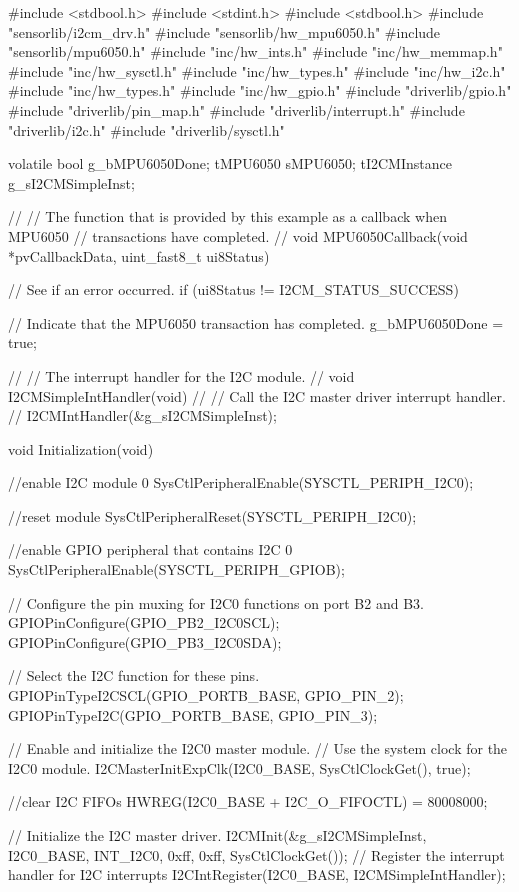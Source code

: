 \documentclass[12pt, a4paper]{article}
\begin{document}
\begin{code}
#include <stdbool.h>
#include <stdint.h>
#include <stdbool.h>
#include "sensorlib/i2cm_drv.h"
#include "sensorlib/hw_mpu6050.h"
#include "sensorlib/mpu6050.h"
#include "inc/hw_ints.h"
#include "inc/hw_memmap.h"
#include "inc/hw_sysctl.h"
#include "inc/hw_types.h"
#include "inc/hw_i2c.h"
#include "inc/hw_types.h"
#include "inc/hw_gpio.h"
#include "driverlib/gpio.h"
#include "driverlib/pin_map.h"
#include "driverlib/interrupt.h"
#include "driverlib/i2c.h"
#include "driverlib/sysctl.h"

volatile bool g_bMPU6050Done;
tMPU6050 sMPU6050;
tI2CMInstance g_sI2CMSimpleInst;

//
// The function that is provided by this example as a callback when MPU6050
// transactions have completed.
//
void MPU6050Callback(void *pvCallbackData, uint_fast8_t ui8Status)
{
    // See if an error occurred.
    if (ui8Status != I2CM_STATUS_SUCCESS)
    {
    }

    // Indicate that the MPU6050 transaction has completed.
    g_bMPU6050Done = true;
}

//
// The interrupt handler for the I2C module.
//
void I2CMSimpleIntHandler(void)
{
    //
    // Call the I2C master driver interrupt handler.
    //
    I2CMIntHandler(&g_sI2CMSimpleInst);
}

void Initialization(void)
{
    //enable I2C module 0
    SysCtlPeripheralEnable(SYSCTL_PERIPH_I2C0);

    //reset module
    SysCtlPeripheralReset(SYSCTL_PERIPH_I2C0);

    //enable GPIO peripheral that contains I2C 0
    SysCtlPeripheralEnable(SYSCTL_PERIPH_GPIOB);

    // Configure the pin muxing for I2C0 functions on port B2 and B3.
    GPIOPinConfigure(GPIO_PB2_I2C0SCL);
    GPIOPinConfigure(GPIO_PB3_I2C0SDA);

    // Select the I2C function for these pins.
    GPIOPinTypeI2CSCL(GPIO_PORTB_BASE, GPIO_PIN_2);
    GPIOPinTypeI2C(GPIO_PORTB_BASE, GPIO_PIN_3);

    // Enable and initialize the I2C0 master module.
    // Use the system clock for the I2C0 module.
    I2CMasterInitExpClk(I2C0_BASE, SysCtlClockGet(), true);

    //clear I2C FIFOs
    HWREG(I2C0_BASE + I2C_O_FIFOCTL) = 80008000;

    // Initialize the I2C master driver.
    I2CMInit(&g_sI2CMSimpleInst, I2C0_BASE, INT_I2C0, 0xff, 0xff, SysCtlClockGet());
    // Register the interrupt handler for I2C interrupts
    I2CIntRegister(I2C0_BASE, I2CMSimpleIntHandler);

}
\end{code}
\end{document}
